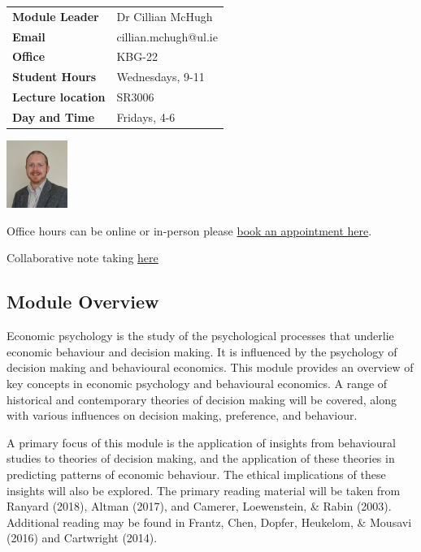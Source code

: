 \documentclass[
  x11names]{article}
\begin{document}
\begin{minipage}{.65\textwidth}
\begin{tabular}{p{4cm} l}
\textbf{Module Leader} & Dr Cillian McHugh\\
\textbf{Email} & cillian.mchugh@ul.ie \\
\textbf{Office} & KBG-22 \\
\textbf{Student Hours} & Wednesdays, 9-11  \\
\textbf{Lecture location} & SR3006\\
\textbf{Day and Time} & Fridays, 4-6 \\
\end{tabular}
\end{minipage}
\hspace{6pt}
\begin{minipage}{.15\textwidth}
\includegraphics[width=75px]{images/cillian_face_2022e.jpg}\bigskip
\end{minipage}

\bigskip

Office hours can be online or in-person please
\color{blue}\href{https://outlook.office.com/bookwithme/user/f570b7289a5343259c60c8a5d26ce510@ul.ie/meetingtype/w1pxpwCL8UG9pt_0cg2fUA2?anonymous&ep=mlink}{book
an appointment here}\color{black}.

Collaborative note taking
\color{blue}\href{https://docs.google.com/document/d/1Yx5EbhSX0uEHzr964dLh7Xx30ZzthbCqV3T32laTl9E/edit?usp=sharing}{here}\color{black}

\subsection{Module Overview}\label{module-overview}

Economic psychology is the study of the psychological processes that
underlie economic behaviour and decision making. It is influenced by the
psychology of decision making and behavioural economics. This module
provides an overview of key concepts in economic psychology and
behavioural economics. A range of historical and contemporary theories
of decision making will be covered, along with various influences on
decision making, preference, and behaviour.

A primary focus of this module is the application of insights from
behavioural studies to theories of decision making, and the application
of these theories in predicting patterns of economic behaviour. The
ethical implications of these insights will also be explored. The
primary reading material will be taken from Ranyard (2018), Altman
(2017), and Camerer, Loewenstein, \& Rabin (2003). Additional reading
may be found in Frantz, Chen, Dopfer, Heukelom, \& Mousavi (2016) and
Cartwright (2014).
\end{document}
